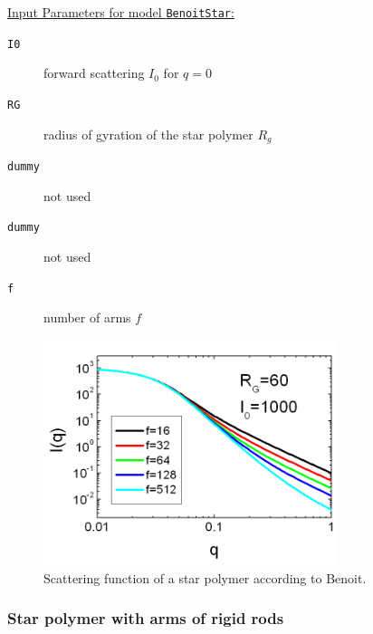 \vspace{5mm}

\noindent
\uline{Input Parameters for model \texttt{BenoitStar}:}
\begin{description}
\item[\texttt{I0}] forward scattering $I_0$ for $q=0$
\item[\texttt{RG}] radius of gyration of the star polymer $R_g$
\item[\texttt{dummy}] not used
\item[\texttt{dummy}] not used
\item[\texttt{f}] number of arms $f$
\end{description}


\begin{figure}[htb]
\begin{center}
\includegraphics[width=0.768\textwidth,height=0.588\textwidth]{Benoit_Iq.png}
\end{center}
\caption{Scattering function of a star polymer according to Benoit. } \label{fig:Benoit_Iq}
\end{figure}

\clearpage


\clearpage
\subsubsection{Star polymer with arms of rigid rods}
\label{sect:StarRigidRods}
~\\
\cite{Huber1989}

